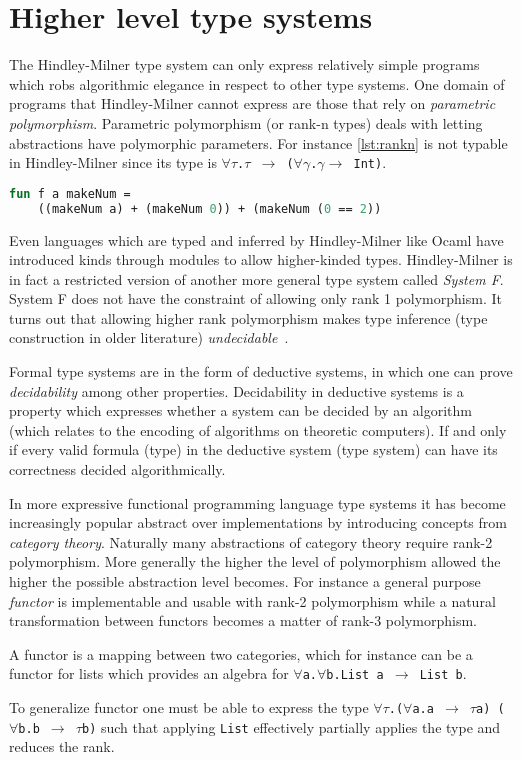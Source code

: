 \documentclass[11pt,oneside,a4paper]{report}
\begin{document}
\section{Higher level type systems}
The Hindley-Milner type system can only express relatively simple programs which robs algorithmic elegance in respect to other type systems.
One domain of programs that Hindley-Milner cannot express are those that rely on \textit{parametric polymorphism}.
Parametric polymorphism (or rank-n types) deals with letting abstractions have polymorphic parameters.
For instance \autoref{lst:rankn} is not typable in Hindley-Milner since its type is \texttt{$\forall\tau$.$\tau$ $\rightarrow$ ($\forall\gamma$.$\gamma \rightarrow$ Int)}.
\begin{lstlisting}[language=ML,caption={Program that requires parametric polymorphism},label={lst:rankn},mathescape=true]
fun f a makeNum =
    ((makeNum a) + (makeNum 0)) + (makeNum (0 == 2))
\end{lstlisting}
Even languages which are typed and inferred by Hindley-Milner like Ocaml have introduced kinds through modules to allow higher-kinded types.
Hindley-Milner is in fact a restricted version of another more general type system called \textit{System F}.
System F does not have the constraint of allowing only rank 1 polymorphism.
It turns out that allowing higher rank polymorphism makes type inference (type construction in older literature) \textit{undecidable}~\cite{wells1999typability}.
\begin{remark}
    Formal type systems are in the form of deductive systems, in which one can prove \textit{decidability} among other properties.
    Decidability in deductive systems is a property which expresses whether a system can be decided by an algorithm (which relates to the encoding of algorithms on theoretic computers).
    If and only if every valid formula (type) in the deductive system (type system) can have its correctness decided algorithmically.
\end{remark}
In more expressive functional programming language type systems it has become increasingly popular abstract over implementations by introducing concepts from \textit{category theory}.
Naturally many abstractions of category theory require rank-2 polymorphism.
More generally the higher the level of polymorphism allowed the higher the possible abstraction level becomes.
For instance a general purpose \textit{functor} is implementable and usable with rank-2 polymorphism while a natural transformation between functors becomes a matter of rank-3 polymorphism.
\begin{remark}
    A functor is a mapping between two categories, which for instance can be a functor for lists which provides an algebra for \texttt{$\forall$a.$\forall$b.List a $\rightarrow$ List b}.
\end{remark}
\noindent To generalize functor one must be able to express the type \texttt{$\forall\tau$.($\forall$a.a $\rightarrow$ $\tau$a) \rightarrow ($\forall$b.b $\rightarrow$ $\tau$b)} such that applying \texttt{List} effectively partially applies the type and reduces the rank.
\end{document}
